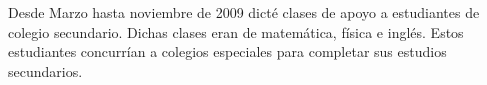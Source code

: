 \item Desde Marzo hasta noviembre de 2009 dict\'e clases de apoyo a estudiantes de colegio secundario. Dichas clases eran de matem\'atica, f\'isica e ingl\'es. Estos estudiantes concurr\'ian a colegios especiales para completar sus estudios secundarios. 
